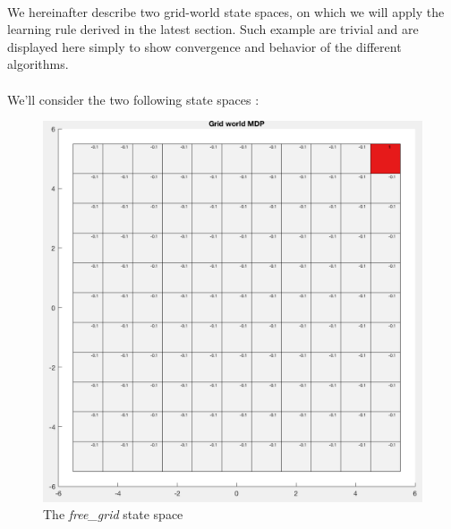 \documentclass[a4paper]{report}
\begin{document}
{{			\paragraph{} We hereinafter describe two grid-world state spaces, on which we will apply the learning rule derived in the latest section. Such example are trivial and are displayed here simply to show convergence and behavior of the different algorithms. 
			
			\paragraph{} We'll consider the two following state spaces : 
			\begin{figure}[ht!]
				\begin{minipage}{0.4\linewidth}
					\includegraphics[width=\linewidth]{free_grid}
					\caption{The \emph{free\_grid} state space}
				\end{minipage}
				\hfill
				\begin{minipage}{0.4\linewidth}

\end{minipage}
\end{figure}}}
\end{document}
